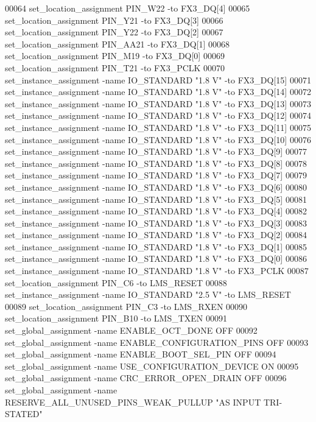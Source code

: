 \begin{DoxyCode}
00064 set\_location\_assignment PIN\_W22 -to FX3\_DQ[4]
00065 set\_location\_assignment PIN\_Y21 -to FX3\_DQ[3]
00066 set\_location\_assignment PIN\_Y22 -to FX3\_DQ[2]
00067 set\_location\_assignment PIN\_AA21 -to FX3\_DQ[1]
00068 set\_location\_assignment PIN\_M19 -to FX3\_DQ[0]
00069 set\_location\_assignment PIN\_T21 -to FX3\_PCLK
00070 set\_instance\_assignment -name IO\_STANDARD "1.\textcolor{vhdllogic}{8} V" -to FX3\_DQ[15]
00071 set\_instance\_assignment -name IO\_STANDARD "1.\textcolor{vhdllogic}{8} V" -to FX3\_DQ[14]
00072 set\_instance\_assignment -name IO\_STANDARD "1.\textcolor{vhdllogic}{8} V" -to FX3\_DQ[13]
00073 set\_instance\_assignment -name IO\_STANDARD "1.\textcolor{vhdllogic}{8} V" -to FX3\_DQ[12]
00074 set\_instance\_assignment -name IO\_STANDARD "1.\textcolor{vhdllogic}{8} V" -to FX3\_DQ[11]
00075 set\_instance\_assignment -name IO\_STANDARD "1.\textcolor{vhdllogic}{8} V" -to FX3\_DQ[10]
00076 set\_instance\_assignment -name IO\_STANDARD "1.\textcolor{vhdllogic}{8} V" -to FX3\_DQ[9]
00077 set\_instance\_assignment -name IO\_STANDARD "1.\textcolor{vhdllogic}{8} V" -to FX3\_DQ[8]
00078 set\_instance\_assignment -name IO\_STANDARD "1.\textcolor{vhdllogic}{8} V" -to FX3\_DQ[7]
00079 set\_instance\_assignment -name IO\_STANDARD "1.\textcolor{vhdllogic}{8} V" -to FX3\_DQ[6]
00080 set\_instance\_assignment -name IO\_STANDARD "1.\textcolor{vhdllogic}{8} V" -to FX3\_DQ[5]
00081 set\_instance\_assignment -name IO\_STANDARD "1.\textcolor{vhdllogic}{8} V" -to FX3\_DQ[4]
00082 set\_instance\_assignment -name IO\_STANDARD "1.\textcolor{vhdllogic}{8} V" -to FX3\_DQ[3]
00083 set\_instance\_assignment -name IO\_STANDARD "1.\textcolor{vhdllogic}{8} V" -to FX3\_DQ[2]
00084 set\_instance\_assignment -name IO\_STANDARD "1.\textcolor{vhdllogic}{8} V" -to FX3\_DQ[1]
00085 set\_instance\_assignment -name IO\_STANDARD "1.\textcolor{vhdllogic}{8} V" -to FX3\_DQ[0]
00086 set\_instance\_assignment -name IO\_STANDARD "1.\textcolor{vhdllogic}{8} V" -to FX3\_PCLK
00087 set\_location\_assignment PIN\_C6 -to LMS\_RESET
00088 set\_instance\_assignment -name IO\_STANDARD "2.\textcolor{vhdllogic}{5} V" -to LMS\_RESET
00089 set\_location\_assignment PIN\_C3 -to LMS\_RXEN
00090 set\_location\_assignment PIN\_B10 -to LMS\_TXEN
00091 set\_global\_assignment -name ENABLE\_OCT\_DONE OFF
00092 set\_global\_assignment -name ENABLE\_CONFIGURATION\_PINS OFF
00093 set\_global\_assignment -name ENABLE\_BOOT\_SEL\_PIN OFF
00094 set\_global\_assignment -name USE\_CONFIGURATION\_DEVICE \textcolor{keywordflow}{ON}
00095 set\_global\_assignment -name CRC\_ERROR\_OPEN\_DRAIN OFF
00096 set\_global\_assignment -name RESERVE\_ALL\_UNUSED\_PINS\_WEAK\_PULLUP "AS INPUT TRI-STATED"

\end{DoxyCode}
